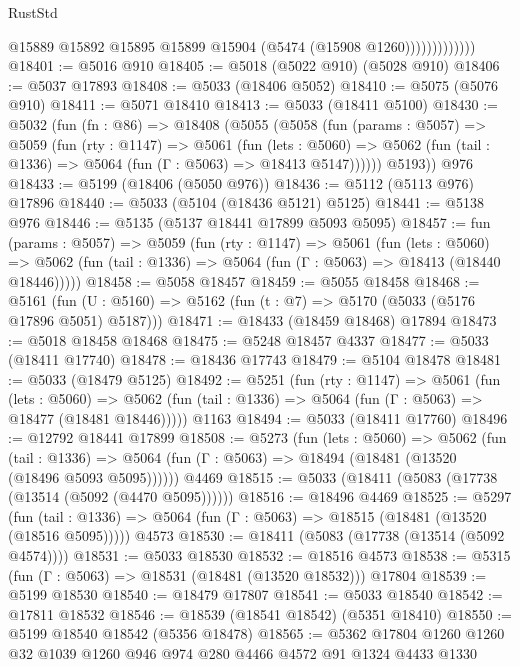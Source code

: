 \begin{lexlean}{RustStd}
\begin{coremodule}
                          @15889
                          @15892
                          @15895
                          @15899
                          @15904
                          (@5474 (@15908 @1260)))))))))))))
@18401 := @5016 @910
@18405 := @5018 (@5022 @910) (@5028 @910)
@18406 := @5037 @17893
@18408 := @5033 (@18406 @5052)
@18410 := @5075 (@5076 @910)
@18411 := @5071 @18410
@18413 := @5033 (@18411 @5100)
@18430 := @5032
    (fun (fn : @86) =>
    @18408
      (@5055
        (@5058
          (fun (params : @5057) =>
          @5059
            (fun (rty : @1147) =>
            @5061
              (fun (lets : @5060) =>
              @5062 (fun (tail : @1336) => @5064 (fun (Γ : @5063) => @18413 @5147))))))
        @5193))
    @976
@18433 := @5199 (@18406 (@5050 @976))
@18436 := @5112 (@5113 @976) @17896
@18440 := @5033 (@5104 (@18436 @5121) @5125)
@18441 := @5138 @976
@18446 := @5135 (@5137 @18441 @17899 @5093 @5095)
@18457 := fun (params : @5057) =>
  @5059
    (fun (rty : @1147) =>
    @5061
      (fun (lets : @5060) =>
      @5062 (fun (tail : @1336) => @5064 (fun (Γ : @5063) => @18413 (@18440 @18446)))))
@18458 := @5058 @18457
@18459 := @5055 @18458
@18468 := @5161
    (fun (U : @5160) => @5162 (fun (t : @7) => @5170 (@5033 (@5176 @17896 @5051) @5187)))
@18471 := @18433 (@18459 @18468) @17894
@18473 := @5018 @18458 @18468
@18475 := @5248 @18457 @4337
@18477 := @5033 (@18411 @17740)
@18478 := @18436 @17743
@18479 := @5104 @18478
@18481 := @5033 (@18479 @5125)
@18492 := @5251
    (fun (rty : @1147) =>
    @5061
      (fun (lets : @5060) =>
      @5062 (fun (tail : @1336) => @5064 (fun (Γ : @5063) => @18477 (@18481 @18446)))))
    @1163
@18494 := @5033 (@18411 @17760)
@18496 := @12792 @18441 @17899
@18508 := @5273
    (fun (lets : @5060) =>
    @5062
      (fun (tail : @1336) =>
      @5064 (fun (Γ : @5063) => @18494 (@18481 (@13520 (@18496 @5093 @5095))))))
    @4469
@18515 := @5033 (@18411 (@5083 (@17738 (@13514 (@5092 (@4470 @5095))))))
@18516 := @18496 @4469
@18525 := @5297
    (fun (tail : @1336) => @5064 (fun (Γ : @5063) => @18515 (@18481 (@13520 (@18516 @5095)))))
    @4573
@18530 := @18411 (@5083 (@17738 (@13514 (@5092 @4574))))
@18531 := @5033 @18530
@18532 := @18516 @4573
@18538 := @5315 (fun (Γ : @5063) => @18531 (@18481 (@13520 @18532))) @17804
@18539 := @5199 @18530
@18540 := @18479 @17807
@18541 := @5033 @18540
@18542 := @17811 @18532
@18546 := @18539 (@18541 @18542) (@5351 @18410)
@18550 := @5199 @18540 @18542 (@5356 @18478)
@18565 := @5362 @17804 @1260 @1260 @32 @1039 @1260 @946 @974 @280 @4466 @4572 @91 @1324 @4433 @1330

\end{coremodule}
\end{lexlean}
